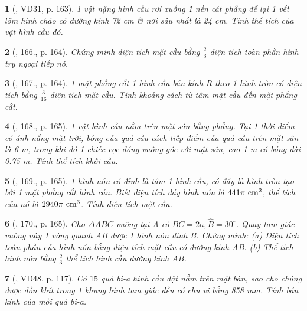 \documentclass{article}
\newtheorem{baitoan}{}
\begin{document}
\begin{baitoan}[\cite{Tuyen_Toan_9_old}, VD31, p. 163]
	1 vật nặng hình cầu rơi xuống 1 nền cát phẳng để lại 1 vết lõm hình chảo có đường kính {\rm72 cm} \& nơi sâu nhất là {\rm24 cm}. Tính thể tích của vật hình cầu đó.
\end{baitoan}

\begin{baitoan}[\cite{Tuyen_Toan_9_old}, 166., p. 164]
	Chứng minh diện tích mặt cầu bằng $\frac{2}{3}$ diện tích toàn phần hình trụ ngoại tiếp nó.
\end{baitoan}

\begin{baitoan}[\cite{Tuyen_Toan_9_old}, 167., p. 164]
	1 mặt phẳng cắt 1 hình cầu bán kính R theo 1 hình tròn có diện tích bằng $\frac{3}{16}$ diện tích mặt cầu. Tính khoảng cách từ tâm mặt cầu đến mặt phẳng cắt.
\end{baitoan}

\begin{baitoan}[\cite{Tuyen_Toan_9_old}, 168., p. 165]
	1 vật hình cầu nằm trên mặt sân bằng phẳng. Tại 1 thời điểm có ánh nắng mặt trời, bóng của quả cầu cách tiếp điểm của quả cầu trên mặt sân là {\rm6 m}, trong khi đó 1 chiếc cọc đóng vuông góc với mặt sân, cao {\rm1 m} có bóng dài {\rm0.75 m}. Tính thể tích khối cầu.
\end{baitoan}

\begin{baitoan}[\cite{Tuyen_Toan_9_old}, 169., p. 165]
	1 hình nón có đỉnh là tâm 1 hình cầu, có đáy là hình tròn tạo bởi 1 mặt phẳng cắt hình cầu. Biết diện tích đáy hình nón là $441\pi\ {\rm cm}^2$, thể tích của nó là $2940\pi\ {\rm cm}^3$. Tính diện tích mặt cầu.
\end{baitoan}

\begin{baitoan}[\cite{Tuyen_Toan_9_old}, 170., p. 165]
	Cho $\Delta ABC$ vuông tại A có $BC = 2a,\widehat{B} = 30^\circ$. Quay tam giác vuông này 1 vòng quanh AB được 1 hình nón đỉnh B. Chứng minh: (a) Diện tích toàn phần của hình nón bằng diện tích mặt cầu có đường kính AB. (b) Thể tích hình nón bằng $\frac{2}{3}$ thể tích hình cầu đường kính AB.
\end{baitoan}

\begin{baitoan}[\cite{Binh_Toan_9_tap_2}, VD48, p. 117]
	Có $15$ quả bi-a hình cầu đặt nằm trên mặt bàn, sao cho chúng được dồn khít trong 1 khung hình tam giác đều có chu vi bằng {\rm858 mm}. Tính bán kính của mỗi quả bi-a.
\end{baitoan}
\end{document}
